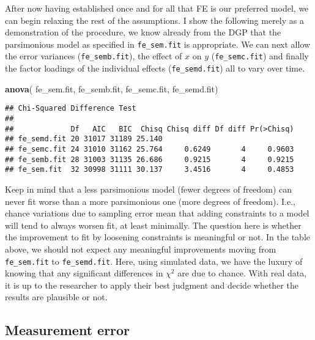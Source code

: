 \documentclass[]{interact}
\theoremstyle{plain}%
\theoremstyle{definition}
\theoremstyle{remark}
\newenvironment{Shaded}{\begin{snugshade}}{\end{snugshade}}
\newcommand{\KeywordTok}[1]{\textcolor[rgb]{0.13,0.29,0.53}{\textbf{#1}}}
\newcommand{\NormalTok}[1]{#1}
\begin{document}
After now having established once and for all that FE is our preferred
model, we can begin relaxing the rest of the assumptions. I show the
following merely as a demonstration of the procedure, we know already
from the DGP that the parsimonious model as specified in
\texttt{fe\_sem.fit} is appropriate. We can next allow the error
variances (\texttt{fe\_semb.fit}), the effect of \(x\) on \(y\)
(\texttt{fe\_semc.fit}) and finally the factor loadings of the
individual effects (\texttt{fe\_semd.fit}) all to vary over time.

\singlespacing

\doublespacing

\small
\singlespacing

\begin{Shaded}
\begin{Highlighting}[]
\KeywordTok{anova}\NormalTok{( fe_sem.fit, fe_semb.fit, fe_semc.fit, fe_semd.fit)}
\end{Highlighting}
\end{Shaded}

\begin{verbatim}
## Chi-Squared Difference Test
## 
##             Df   AIC   BIC  Chisq Chisq diff Df diff Pr(>Chisq)
## fe_semd.fit 20 31017 31189 25.140                              
## fe_semc.fit 24 31010 31162 25.764     0.6249       4     0.9603
## fe_semb.fit 28 31003 31135 26.686     0.9215       4     0.9215
## fe_sem.fit  32 30998 31111 30.137     3.4516       4     0.4853
\end{verbatim}

\doublespacing
\normalsize

Keep in mind that a less parsimonious model (fewer degrees of freedom)
can never fit worse than a more parsimonious one (more degrees of
freedom). I.e., chance variations due to sampling error mean that adding
constraints to a model will tend to always worsen fit, at least
minimally. The question here is whether the improvement to fit by
loosening constraints is meaningful or not. In the table above, we
should not expect any meaningful improvements moving from
\texttt{fe\_sem.fit} to \texttt{fe\_semd.fit}. Here, using simulated
data, we have the luxury of knowing that any significant differences in
\(\chi^{2}\) are due to chance. With real data, it is up to the
researcher to apply their best judgment and decide whether the results
are plausible or not.

\hypertarget{measerr}{%
\subsection{Measurement error}\label{measerr}}
\end{document}
